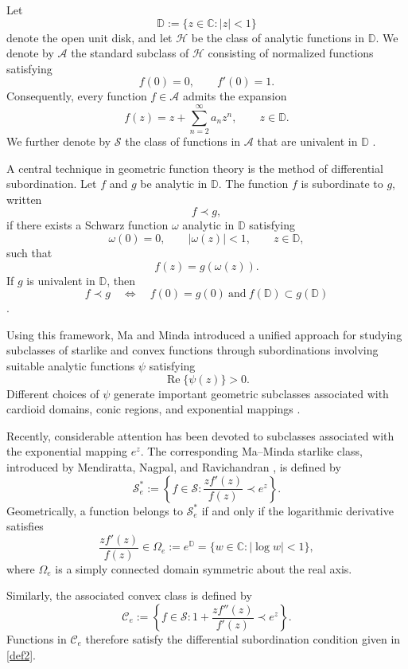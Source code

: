\documentclass[12pt]{article}
\renewcommand{\Re}{\operatorname{Re}}
\begin{document}
Let
\[
\mathbb{D} := \{z \in \mathbb{C} : |z| < 1\}
\]
denote the open unit disk, and let $\mathcal{H}$ be the class of analytic functions in $\mathbb{D}$. We denote by $\mathcal{A}$ the standard subclass of $\mathcal{H}$ consisting of normalized functions satisfying
\[
f(0)=0,
\qquad
f'(0)=1.
\]
Consequently, every function $f\in\mathcal{A}$ admits the expansion
\[
f(z)=z+\sum_{n=2}^{\infty}a_n z^n,
\qquad z\in\mathbb{D}.
\]
We further denote by $\mathcal{S}$ the class of functions in $\mathcal{A}$ that are univalent in $\mathbb{D}$ \cite{pm8}.

A central technique in geometric function theory is the method of differential subordination. Let $f$ and $g$ be analytic in $\mathbb{D}$. The function $f$ is subordinate to $g$, written
\[
f\prec g,
\]
if there exists a Schwarz function $\omega$ analytic in $\mathbb{D}$ satisfying
\[
\omega(0)=0,
\qquad
|\omega(z)|<1,
\qquad z\in\mathbb{D},
\]
such that
\[
f(z)=g(\omega(z)).
\]
If $g$ is univalent in $\mathbb{D}$, then
\[
f\prec g
\quad\Longleftrightarrow\quad
f(0)=g(0)
\ \text{and}\
f(\mathbb{D})\subset g(\mathbb{D})
\]
\cite{pm8}.

Using this framework, Ma and Minda \cite{pm10} introduced a unified approach for studying subclasses of starlike and convex functions through subordinations involving suitable analytic functions $\psi$ satisfying
\[
\Re\{\psi(z)\}>0.
\]
Different choices of $\psi$ generate important geometric subclasses associated with cardioid domains, conic regions, and exponential mappings \cite{pm2, pm10}.

Recently, considerable attention has been devoted to subclasses associated with the exponential mapping $e^z$. The corresponding Ma--Minda starlike class, introduced by Mendiratta, Nagpal, and Ravichandran \cite{Mendiratta2015}, is defined by
\begin{equation}\label{def1}
\mathcal{S}_e^*
:=
\left\{
f\in\mathcal{S} :
\frac{zf'(z)}{f(z)}
\prec e^z
\right\}.
\end{equation}
Geometrically, a function belongs to $\mathcal{S}_e^*$ if and only if the logarithmic derivative satisfies
\[
\frac{zf'(z)}{f(z)}
\in
\Omega_e:=e^{\mathbb{D}}
=
\{w\in\mathbb{C}:|\log w|<1\},
\]
where $\Omega_e$ is a simply connected domain symmetric about the real axis.

Similarly, the associated convex class is defined by
\begin{equation}\label{def2}
\mathcal{C}_e
:=
\left\{
f\in\mathcal{S} :
1+\frac{zf''(z)}{f'(z)}
\prec e^z
\right\}.
\end{equation}
Functions in $\mathcal{C}_e$ therefore satisfy the differential subordination condition given in \eqref{def2}.
\end{document}
